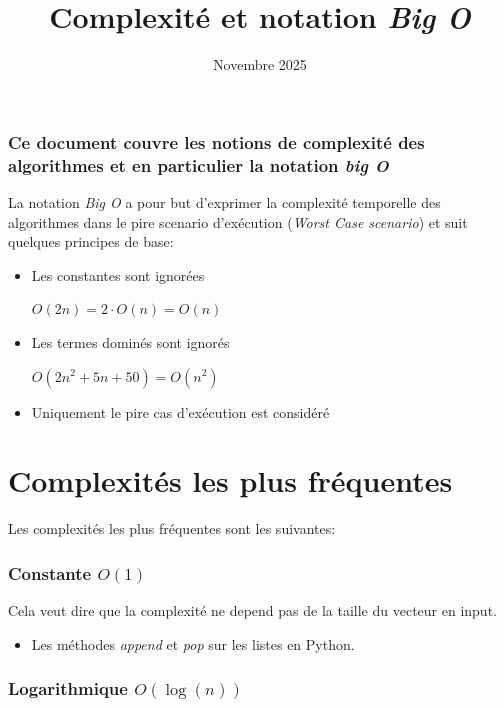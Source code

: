 \documentclass{article}
\title{Complexité et notation \emph{Big O}}
\date{Novembre 2025}
\begin{document}
\maketitle

\subsubsection*{Ce document couvre les notions de complexité des algorithmes et en particulier la notation \emph{big O}}

La notation \emph{Big O} a pour but d'exprimer la complexité temporelle des algorithmes dans le pire scenario d'exécution (\textit{Worst Case scenario}) et suit quelques principes de base:

\begin{itemize}
    \item Les constantes sont ignorées
    
    $O(2n) = 2 \cdot O(n) = O(n)$
    
    \item Les termes dominés sont ignorés
    
    $O(2n^2 + 5n + 50) = O(n^2)$
    
    
    \item Uniquement le pire cas d'exécution est considéré
\end{itemize}

\section*{Complexités les plus fréquentes}

Les complexités les plus fréquentes sont les suivantes:

\subsubsection*{Constante $O(1)$}

Cela veut dire que la complexité ne depend pas de la taille du vecteur en input.
\begin{itemize}
    \item Les méthodes \emph{append} et \emph{pop} sur les listes en Python.
\end{itemize}

\subsubsection*{Logarithmique $O(\log(n))$}
\end{document}
